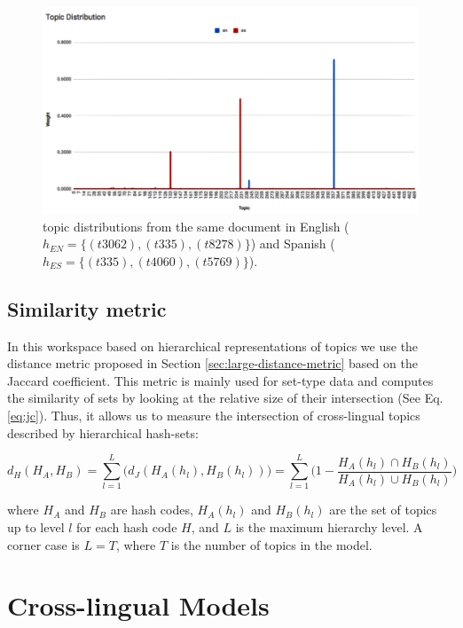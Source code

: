 \begin{figure}[t]\centering
\includegraphics[scale=0.4]{topic-dist.png}
\caption{topic distributions from the same document in English ($h_{EN}=\{(t3062),(t335),(t8278)\}$) and Spanish ($h_{ES}=\{(t335),(t4060),(t5769)\}$).}
\label{fig:topic_distributions}
\end{figure}

\subsection{Similarity metric}
In this workspace based on hierarchical representations of topics we use the distance metric proposed in Section \ref{sec:large-distance-metric} based on the Jaccard coefficient. This metric is mainly used for set-type data \citep{Li2012, Ji2013, Li2010b, Zhao2013} and computes the similarity of sets by looking at the relative size of their intersection (See Eq. \ref{eq:jc}). Thus, it allows us to measure the intersection of cross-lingual topics described by hierarchical hash-sets:

\begin{equation}
d_H(H_A,H_B) = \sum\limits_{l=1}^L \Big( d_J(H_A(h_l),H_B(h_l)) \Big) = 
\sum\limits_{l=1}^L \Big( 1 - \frac{H_A(h_l) \cap H_B(h_l)}{H_A(h_l) \cup H_B(h_l)} \Big) 
\label{eq:dh2}
\end{equation}

where $H_A$ and $H_B$ are hash codes, $H_A(h_l)$ and $H_B(h_l)$ are the set of topics up to level $l$ for each hash code $H$,  and $L$ is the maximum hierarchy level. A corner case is $L=T$, where $T$ is the number of topics in the model. 

\section{Cross-lingual Models}
\label{sec:crosslingual-models}

